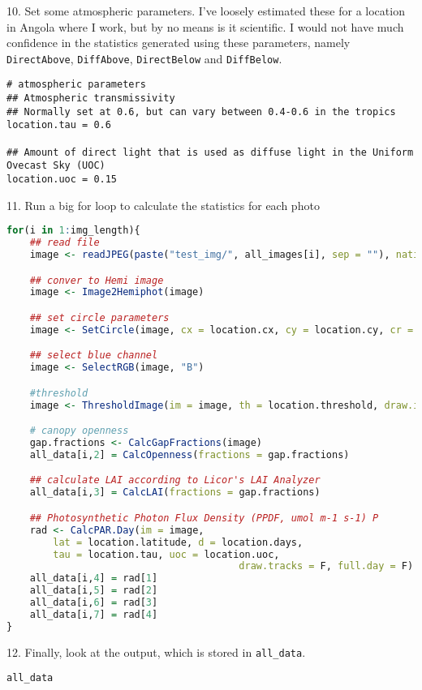 \documentclass{article}
\begin{document}
10. Set some atmospheric parameters. I've loosely estimated these for a location in Angola where I work, but by no means is it scientific. I would not have much confidence in the statistics generated using these parameters, namely \texttt{DirectAbove}, \texttt{DiffAbove}, \texttt{DirectBelow} and \texttt{DiffBelow}.

\begin{lstlisting}
# atmospheric parameters
## Atmospheric transmissivity
## Normally set at 0.6, but can vary between 0.4-0.6 in the tropics
location.tau = 0.6

## Amount of direct light that is used as diffuse light in the Uniform Ovecast Sky (UOC)
location.uoc = 0.15
\end{lstlisting}

11. Run a big for loop to calculate the statistics for each photo

\begin{lstlisting}[language=R]
for(i in 1:img_length){
	## read file
	image <- readJPEG(paste("test_img/", all_images[i], sep = ""), native = F)

	## conver to Hemi image
	image <- Image2Hemiphot(image)

	## set circle parameters
	image <- SetCircle(image, cx = location.cx, cy = location.cy, cr = location.cr)

	## select blue channel
	image <- SelectRGB(image, "B")

	#threshold
	image <- ThresholdImage(im = image, th = location.threshold, draw.image = F)

	# canopy openness
	gap.fractions <- CalcGapFractions(image)
	all_data[i,2] = CalcOpenness(fractions = gap.fractions)

	## calculate LAI according to Licor's LAI Analyzer
	all_data[i,3] = CalcLAI(fractions = gap.fractions)

	## Photosynthetic Photon Flux Density (PPDF, umol m-1 s-1) P
	rad <- CalcPAR.Day(im = image,
		lat = location.latitude, d = location.days,
		tau = location.tau, uoc = location.uoc,
										draw.tracks = F, full.day = F)
	all_data[i,4] = rad[1]
	all_data[i,5] = rad[2]
	all_data[i,6] = rad[3]
	all_data[i,7] = rad[4]
}
\end{lstlisting}

12. Finally, look at the output, which is stored in \texttt{all\_data}.

\begin{lstlisting}
all_data
\end{lstlisting}
\end{document}
